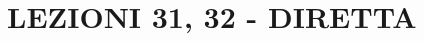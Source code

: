 \section{LEZIONI 31, 32 - DIRETTA}
\begin{comment}
Vediamo un esempio di proiettività di $\proj[1]{\ }$.
\begin{example}
	Si consideri $\proj[1]{\ } {\kamp} = \kamp \cup \{\infty\}$ con $\infty=(0\colon 1)$. Sia $\funz f {\proj[1]{\ }} {\proj[1]{\ }}$ una proiettività (dunque biunivoca) definita come $f(x_0\colon x_1)=(ax_0+bx_1\colon cx_0+dx_1)$. Si ha che: $f(0\colon 1)=(b\colon d)$, mentre la sua controimmagine è $f(-b\colon a)=(0\colon 1)$, infatti basta porre $ax_0+bx_1=0$.\newline
	
	
	

	Sia $t=\frac{x_1}{x_0}$ la coordinata affine su $\kamp$, tutti i punti $x_o x_1$ si possono scrivere come $(x_0\colon x_1)=\left( 1\colon \frac{x_1}{x_0} \right)=(1\colon t)$, il che corrisponde al punto $t$ 
	della retta affine k. Se si scrive l'immagine $f(x_0\colon x_1)=$ sfruttando l'oss appena fatta divido per la prima coordinata, ottenendo un termine per cui raccogliendo $x_0$ viene $\frac$, ovvero come   Dunque la proiettività $f$ corrisponde alla trasformazione $\funz F {\camp\cup \{\infty\}} {\camp\cup \{\infty\}}$ con $F(t)=\begin{cases}
				\end{cases}$
\end{example}




\end{comment}
